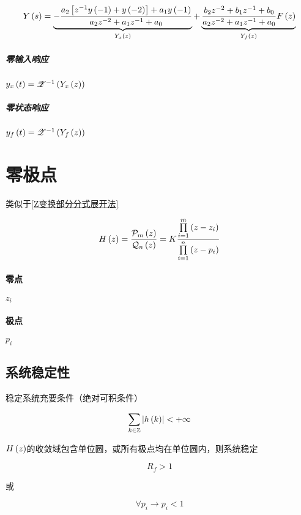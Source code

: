 \documentclass{article}
\begin{document}
\[Y\left(s\right)
    =\underbrace{-\frac{a_2\left[z^{-1}y\left(-1\right)+y\left(-2\right)\right]+a_1y\left(-1\right)}{a_2z^{-2}+a_1z^{-1}+a_0}}_{Y_x\left(z\right)}
    +\underbrace{\frac{b_2z^{-2}+b_1z^{-1}+b_0}{a_2z^{-2}+a_1z^{-1}+a_0}F\left(z\right)}_{Y_f\left(z\right)}\]

\subparagraph{零输入响应}

$y_x\left(t\right)=\mathscr Z^{-1}\left(Y_x\left(z\right)\right)$

\subparagraph{零状态响应}

$y_f\left(t\right)=\mathscr Z^{-1}\left(Y_f\left(z\right)\right)$

\section{零极点}

类似于\ref{Z变换部分分式展开法}

\[H\left(z\right)=\frac{\mathcal P_m\left(z\right)}{\mathcal Q_n\left(z\right)}
    =K\frac{\prod\limits_{i=1}^m\left(z-z_i\right)}
    {\prod\limits_{i=1}^n\left(z-p_i\right)}\]

\paragraph{零点}$z_i$

\paragraph{极点}$p_i$

\subsection{系统稳定性}

稳定系统充要条件（绝对可积条件）

\[\sum_{k\in\mathbb Z}\left|h\left(k\right)\right|<+\infty\]

$H\left(z\right)$的收敛域包含单位圆，或所有极点均在单位圆内，则系统稳定

\[R_f>1\]

或

\[\forall p_i\to p_i<1\]
\end{document}
